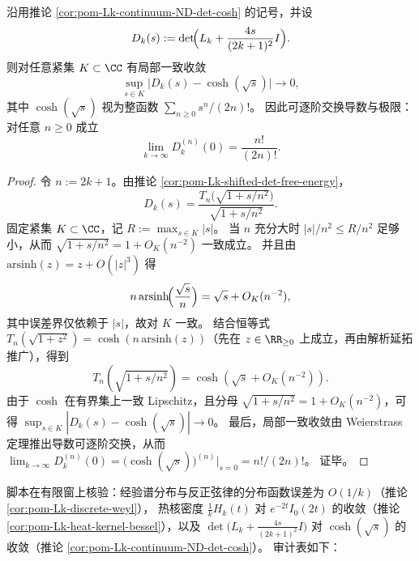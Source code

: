 \begin{corollary}\label{cor:pom-Lk-continuum-ND-det-cosh-locally-uniform}
沿用推论 \ref{cor:pom-Lk-continuum-ND-det-cosh} 的记号，并设
\[
D_k(s):=\det\!\Bigl(L_k+\frac{4s}{(2k+1)^2}I\Bigr).
\]
则对任意紧集 \(K\subset\CC\) 有局部一致收敛
\[
\sup_{s\in K}\bigl|D_k(s)-\cosh(\sqrt{s})\bigr|\longrightarrow 0,
\]
其中 \(\cosh(\sqrt{s})\) 视为整函数
\(
\sum_{n\ge 0}s^n/(2n)!
\)。
因此可逐阶交换导数与极限：对任意 \(n\ge 0\) 成立
\[
\lim_{k\to\infty}D_k^{(n)}(0)=\frac{n!}{(2n)!}.
\]
\end{corollary}
\begin{proof}
令 \(n:=2k+1\)。由推论 \ref{cor:pom-Lk-shifted-det-free-energy}，
\[
D_k(s)=\frac{T_{n}\!\bigl(\sqrt{1+s/n^2}\bigr)}{\sqrt{1+s/n^2}}.
\]
固定紧集 \(K\subset\CC\)，记 \(R:=\max_{s\in K}|s|\)。
当 \(n\) 充分大时 \(|s|/n^2\le R/n^2\) 足够小，从而
\(\sqrt{1+s/n^2}=1+O_K(n^{-2})\) 一致成立。
并且由 \(\mathrm{arsinh}(z)=z+O(|z|^3)\) 得
\[
n\,\mathrm{arsinh}\!\Bigl(\frac{\sqrt{s}}{n}\Bigr)=\sqrt{s}+O_K(n^{-2}),
\]
其中误差界仅依赖于 \(|s|\)，故对 \(K\) 一致。
结合恒等式 \(T_n(\sqrt{1+z^2})=\cosh(n\,\mathrm{arsinh}(z))\)（先在 \(z\in\RR_{\ge 0}\) 上成立，再由解析延拓推广），得到
\[
T_n(\sqrt{1+s/n^2})=\cosh(\sqrt{s}+O_K(n^{-2})).
\]
由于 \(\cosh\) 在有界集上一致 Lipschitz，且分母 \(\sqrt{1+s/n^2}=1+O_K(n^{-2})\)，可得
\(
\sup_{s\in K}|D_k(s)-\cosh(\sqrt{s})|\to 0
\)。
最后，局部一致收敛由 Weierstrass 定理推出导数可逐阶交换，从而
\(
\lim_{k\to\infty}D_k^{(n)}(0)=\bigl(\cosh(\sqrt{s})\bigr)^{(n)}|_{s=0}=n!/(2n)!
\)。
证毕。
\end{proof}

\begin{remark}\label{rem:pom-fence-green-kernel-spectral-limit-laws-audit}
脚本在有限窗上核验：经验谱分布与反正弦律的分布函数误差为 \(O(1/k)\)（推论 \ref{cor:pom-Lk-discrete-weyl}），
热核密度 \(\frac{1}{k}H_k(t)\) 对 \(e^{-2t}I_0(2t)\) 的收敛（推论 \ref{cor:pom-Lk-heat-kernel-bessel}），以及
\(\det\bigl(L_k+\frac{4s}{(2k+1)^2}I\bigr)\) 对 \(\cosh(\sqrt{s})\) 的收敛（推论 \ref{cor:pom-Lk-continuum-ND-det-cosh}）。
审计表如下：

\end{remark}
